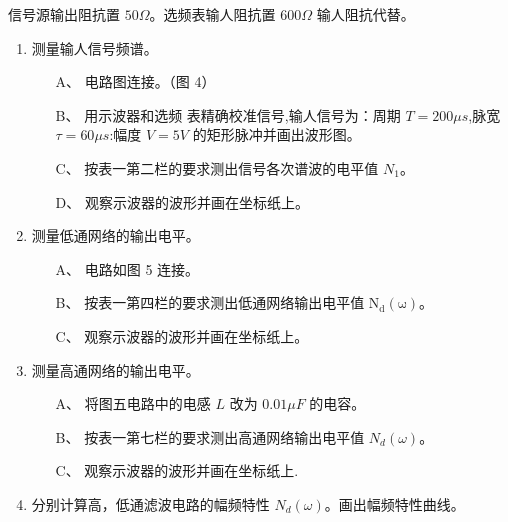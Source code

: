 \documentclass[dvipsnames, svgnames,a4paper,11pt]{article}
\begin{document}
信号源输出阻抗置 $50\Omega$。选频表输人阻抗置 $600\Omega$ 输人阻抗代替。

\begin{figure}[htbp]
	\centering
	\caption{}
\end{figure}

\begin{enumerate}
	\item 测量输人信号频谱。
	\begin{enumerate}
    \item[A、] 电路图连接。（图 4）
    \item[B、] 用示波器和选频 表精确校准信号,输人信号为：周期 $T = 200\mu s$,脉宽 $\tau =60 \mu s$:幅度 $V=5V$ 的矩形脉冲并画出波形图。
    \item[C、] 按表一第二栏的要求测出信号各次谱波的电平值 $N_1$。
    \item[D、] 观察示波器的波形并画在坐标纸上。
  \end{enumerate}
	\item 测量低通网络的输出电平。
	  \begin{enumerate}
      \item[A、] 电路如图 5 连接。
      \item[B、] 按表一第四栏的要求测出低通网络输出电平值 $\mathrm{N_d(\omega)}$。
      \item[C、] 观察示波器的波形并画在坐标纸上。
    \end{enumerate}
  \item 测量高通网络的输出电平。
    \begin{enumerate}
      \item[A、] 将图五电路中的电感 $L$ 改为 $0.01\mu F$ 的电容。
      \item[B、] 按表一第七栏的要求测出高通网络输出电平值 $N_d(\omega)$。
      \item[C、] 观察示波器的波形并画在坐标纸上.
    \end{enumerate}
  \item 分别计算高，低通滤波电路的幅频特性 $N_d(\omega)$。画出幅频特性曲线。
\end{enumerate}

\begin{figure}[htbp]
	\centering
	\caption{}
\end{figure}
\end{document}
